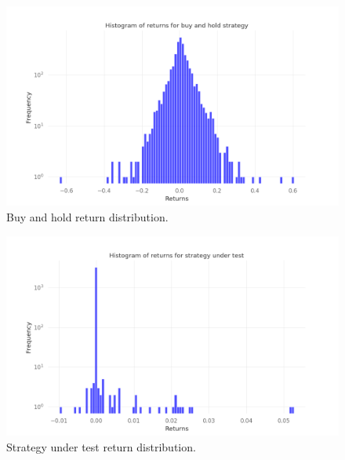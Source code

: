 \begin{figure}[H]
    \centering
    \includegraphics[width=1.1\textwidth]{results/images/hist_returns_btc.png}
    \caption{Buy and hold return distribution.}
    \label{fig:b_h_return_distribution}
\end{figure}

\begin{figure}[H]
    \centering
    \includegraphics[width=1.1\textwidth]{results/images/hist_returns_st.png}
    \caption{Strategy under test return distribution.}
    \label{fig:st_return_distribution}
\end{figure}
